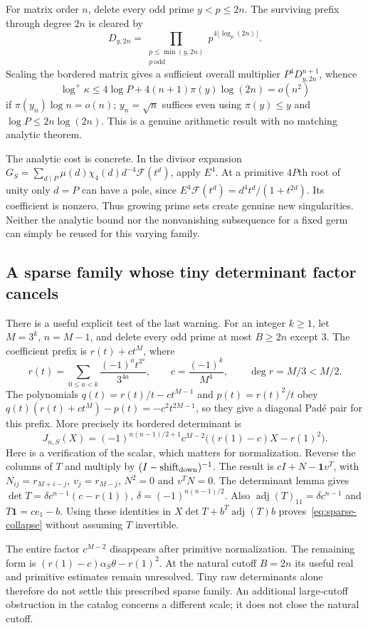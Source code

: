 For matrix order $n$, delete every odd prime $y<p\leq2n$.
The surviving prefix through degree $2n$ is cleared by
\[
 D_{y,2n}=\prod_{\substack{p\leq\min(y,2n)\\p\ \text{odd}}}
              p^{4\lfloor\log_p(2n)\rfloor}.
\]
Scaling the bordered matrix gives a sufficient overall multiplier
$P^4D_{y,2n}^{n+1}$, whence
\[
 \log^+\kappa\leq4\log P+4(n+1)\pi(y)\log(2n)=o(n^2)
\]
if $\pi(y_n)\log n=o(n)$; $y_n=\sqrt n$ suffices even using
$\pi(y)\leq y$ and $\log P\leq2n\log(2n)$.
This is a genuine arithmetic result with no matching analytic theorem.

The analytic cost is concrete. In the divisor expansion
$G_S=\sum_{d\mid P}\mu(d)\chi_4(d)d^{-4}\mathcal F(t^d)$,
apply $E^4$. At a primitive $4P$th root of unity only $d=P$
can have a pole, since $E^4\mathcal F(t^d)=d^4t^d/(1+t^{2d})$.
Its coefficient is nonzero. Thus growing prime sets create genuine
new singularities. Neither the analytic bound nor the nonvanishing
subsequence for a fixed germ can simply be reused for this varying family.

\subsection{A sparse family whose tiny determinant factor cancels}
There is a useful explicit test of the last warning. For an integer
$k\geq1$, let $M=3^k$,
$n=M-1$, and delete every odd prime at most $B\geq2n$ except 3.
The coefficient prefix is $r(t)+ct^M$, where
\[
 r(t)=\sum_{0\leq a<k}\frac{(-1)^at^{3^a}}{3^{4a}},\qquad
 c=\frac{(-1)^k}{M^4},\qquad \deg r=M/3<M/2.
\]
The polynomials $q(t)=r(t)/t-ct^{M-1}$ and $p(t)=r(t)^2/t$ obey
$q(t)(r(t)+ct^M)-p(t)=-c^2t^{2M-1}$, so they give a diagonal
Pad\'e pair for this prefix. More precisely its bordered determinant is
\begin{equation}\label{eq:sparse-collapse}
 J_{n,S}(X)=(-1)^{n(n-1)/2+1}c^{M-2}
                 \bigl((r(1)-c)X-r(1)^2\bigr).
\end{equation}
Here is a verification of the scalar, which matters for normalization.
Reverse the columns of $T$ and multiply by $(I-\mathrm{shift}_{\rm down})^{-1}$.
The result is $cI+N-\mathbf1v^T$, with
$N_{ij}=r_{M+i-j}$, $v_j=r_{M-j}$, $N^2=0$ and $v^TN=0$.
The determinant lemma gives
$\det T=\delta c^{n-1}(c-r(1))$, $\delta=(-1)^{n(n-1)/2}$.
Also $\operatorname{adj}(T)_{11}=\delta c^{n-1}$ and
$T\mathbf1=ce_1-b$. Using these identities in
$X\det T+b^T\operatorname{adj}(T)b$ proves~\eqref{eq:sparse-collapse}
without assuming $T$ invertible.

The entire factor $c^{M-2}$ disappears after primitive normalization.
The remaining form is
$(r(1)-c)\alpha_S\theta-r(1)^2$. At the natural cutoff $B=2n$
its useful real and primitive estimates remain unresolved. Tiny raw
determinants alone therefore do not settle this prescribed sparse family.
An additional large-cutoff obstruction in the catalog concerns a
different scale; it does not close the natural cutoff.
